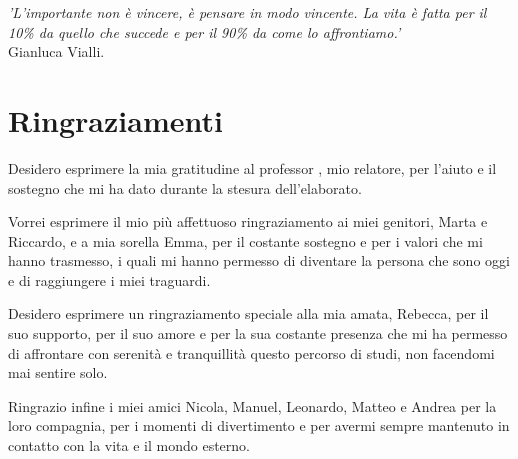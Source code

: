 \cleardoublepage
{}
{}

\begin{flushright}{
        \slshape
        'L'importante non è vincere, è pensare in modo vincente. La vita è fatta per il 10\% da quello che succede e per il 90\% da come lo affrontiamo.'} \\
    \medskip
    Gianluca Vialli.
\end{flushright}

\begingroup
\let\clearpage\relax
\let\cleardoublepage\relax
\let\cleardoublepage\relax

\chapter*{Ringraziamenti}

\noindent Desidero esprimere la mia gratitudine al professor \myProf, mio relatore, per l'aiuto e il sostegno che mi ha dato durante la stesura dell'elaborato.

\vspace{0.35cm}

\noindent Vorrei esprimere il mio più affettuoso ringraziamento ai miei genitori, Marta e Riccardo, e a mia sorella Emma, per il costante sostegno e
per i valori che mi hanno trasmesso, i quali mi hanno permesso di diventare la persona che sono oggi e di raggiungere i miei traguardi.

\vspace{0.35cm}

\noindent Desidero esprimere un ringraziamento speciale alla mia amata, Rebecca, per il suo supporto, per il suo amore e per la sua costante presenza che mi ha permesso di
affrontare con serenità e tranquillità questo percorso di studi, non facendomi mai sentire solo.

\vspace{0.35cm}

\noindent Ringrazio infine i miei amici Nicola, Manuel, Leonardo, Matteo e Andrea per la loro compagnia, per i momenti di divertimento e per avermi sempre mantenuto in
contatto con la vita e il mondo esterno.

\vspace{0.75cm}

\noindent{\myLocation, \myTime}
\hfill \textit{\myName}

\endgroup
